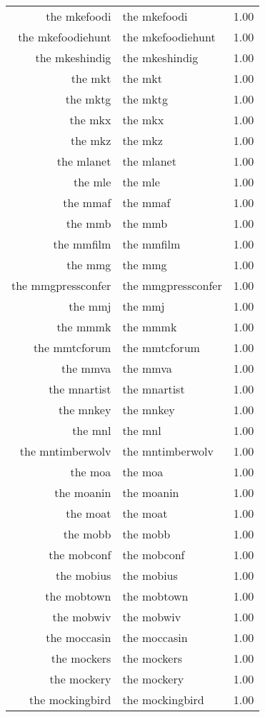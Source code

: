 \begin{table}[ht]
\begin{tabular}{rlr}
  the mkefoodi & the mkefoodi & 1.00 \\ 
  the mkefoodiehunt & the mkefoodiehunt & 1.00 \\ 
  the mkeshindig & the mkeshindig & 1.00 \\ 
  the mkt & the mkt & 1.00 \\ 
  the mktg & the mktg & 1.00 \\ 
  the mkx & the mkx & 1.00 \\ 
  the mkz & the mkz & 1.00 \\ 
  the mlanet & the mlanet & 1.00 \\ 
  the mle & the mle & 1.00 \\ 
  the mmaf & the mmaf & 1.00 \\ 
  the mmb & the mmb & 1.00 \\ 
  the mmfilm & the mmfilm & 1.00 \\ 
  the mmg & the mmg & 1.00 \\ 
  the mmgpressconfer & the mmgpressconfer & 1.00 \\ 
  the mmj & the mmj & 1.00 \\ 
  the mmmk & the mmmk & 1.00 \\ 
  the mmtcforum & the mmtcforum & 1.00 \\ 
  the mmva & the mmva & 1.00 \\ 
  the mnartist & the mnartist & 1.00 \\ 
  the mnkey & the mnkey & 1.00 \\ 
  the mnl & the mnl & 1.00 \\ 
  the mntimberwolv & the mntimberwolv & 1.00 \\ 
  the moa & the moa & 1.00 \\ 
  the moanin & the moanin & 1.00 \\ 
  the moat & the moat & 1.00 \\ 
  the mobb & the mobb & 1.00 \\ 
  the mobconf & the mobconf & 1.00 \\ 
  the mobius & the mobius & 1.00 \\ 
  the mobtown & the mobtown & 1.00 \\ 
  the mobwiv & the mobwiv & 1.00 \\ 
  the moccasin & the moccasin & 1.00 \\ 
  the mockers & the mockers & 1.00 \\ 
  the mockery & the mockery & 1.00 \\ 
  the mockingbird & the mockingbird & 1.00 \\ 

\end{tabular}
\end{table}
